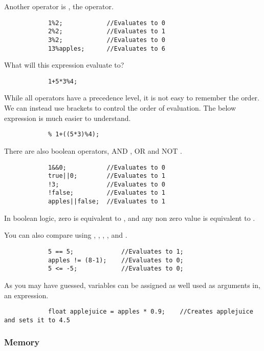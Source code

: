 \documentclass{article}
\begin{document}
			Another operator is \inlncd{\%}, the  operator.

			\begin{lstlisting}
			1%2;			//Evaluates to 0
			2%2;			//Evaluates to 1
			3%2;			//Evaluates to 0
			13%apples;		//Evaluates to 6
			\end{lstlisting}

			What will this expression evaluate to?

			\begin{lstlisting}
			1+5*3%4;
			\end{lstlisting}

			While all operators have a precedence level, it is not easy to remember the order. We can instead use brackets to control the order of evaluation. The below expression is much easier to understand.

			\begin{lstlisting}
			% 1+((5*3)%4);
			\end{lstlisting}

			There are also boolean operators, AND \inlncd{\&\&}, OR \inlncd{||} and NOT \inlncd{!}.

			\begin{lstlisting}
			1&&0;			//Evaluates to 0
			true||0;		//Evaluates to 1
			!3;				//Evaluates to 0
			!false;			//Evaluates to 1
			apples||false;	//Evaluates to 1
			\end{lstlisting}

			In boolean logic, zero is equivalent to , and any non zero value is equivalent to .

			You can also compare using \inlncd{==}, \inlncd{!=}, \inlncd{>}, \inlncd{>=}, \inlncd{<} and \inlncd{<=}.

			\begin{lstlisting}
			5 == 5;				//Evaluates to 1;
			apples != (8-1);	//Evaluates to 0;
			5 <= -5;			//Evaluates to 0;
			\end{lstlisting}


			As you may have guessed, variables can be assigned as well used as arguments in, an expression.

			\begin{lstlisting}
			float applejuice = apples * 0.9;	//Creates applejuice and sets it to 4.5
			\end{lstlisting}

		\subsubsection{Memory}
\end{document}
